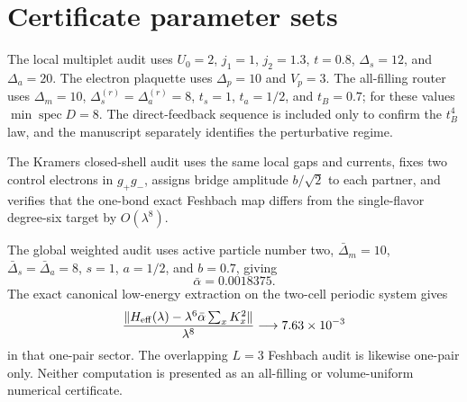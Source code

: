 \documentclass[11pt]{article}
\theoremstyle{definition}
\theoremstyle{remark}
\newcommand{\spec}{\operatorname{spec}}
\newcommand{\norm}[1]{\lVert #1\rVert}
\begin{document}
\section{Certificate parameter sets}
\label{app:certificates}

The local multiplet audit uses $U_0=2$, $j_1=1$, $j_2=1.3$, $t=0.8$, $\Delta_s=12$, and $\Delta_a=20$.  The electron plaquette uses $\Delta_p=10$ and $V_p=3$.  The all-filling router uses $\Delta_m=10$, $\Delta_s^{(r)}=\Delta_a^{(r)}=8$, $t_s=1$, $t_a=1/2$, and $t_B=0.7$; for these values $\min\spec D=8$.  The direct-feedback sequence is included only to confirm the $t_B^4$ law, and the manuscript separately identifies the perturbative regime.

The Kramers closed-shell audit uses the same local gaps and currents, fixes two control electrons in $g_+g_-$, assigns bridge amplitude $b/\sqrt2$ to each partner, and verifies that the one-bond exact Feshbach map differs from the single-flavor degree-six target by $O(\lambda^8)$.

The global weighted audit uses active particle number two, $\bar\Delta_m=10$, $\bar\Delta_s=\bar\Delta_a=8$, $s=1$, $a=1/2$, and $b=0.7$, giving
\begin{equation}
 \bar\alpha=0.0018375.
\end{equation}
The exact canonical low-energy extraction on the two-cell periodic system gives
\begin{equation}
 \frac{\norm{H_{\rm eff}(\lambda)-\lambda^6\bar\alpha\sum_xK_x^2}}{\lambda^8}
 \longrightarrow 7.63\times10^{-3}
\end{equation}
in that one-pair sector.  The overlapping $L=3$ Feshbach audit is likewise one-pair only.  Neither computation is presented as an all-filling or volume-uniform numerical certificate.
\end{document}
